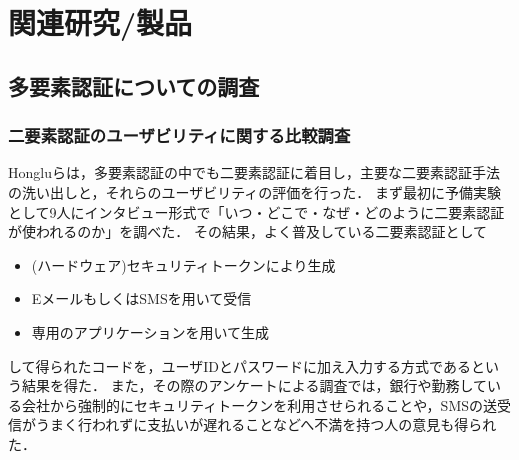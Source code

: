 \chapter{関連研究/製品}\label{chap:relatedwork}
\section{多要素認証についての調査}
\subsection{二要素認証のユーザビリティに関する比較調査}
Hongluら\cite{DBLP:journals/corr/CristofaroDFN13}は，多要素認証の中でも二要素認証に着目し，主要な二要素認証手法の洗い出しと，それらのユーザビリティの評価を行った．
まず最初に予備実験として9人にインタビュー形式で「いつ・どこで・なぜ・どのように二要素認証が使われるのか」を調べた．
その結果，よく普及している二要素認証として
\begin{itemize}
  \item (ハードウェア)セキュリティトークンにより生成
  \item EメールもしくはSMSを用いて受信
  \item 専用のアプリケーションを用いて生成
\end{itemize}
して得られたコードを，ユーザIDとパスワードに加え入力する方式であるという結果を得た．
また，その際のアンケートによる調査では，銀行や勤務している会社から強制的にセキュリティトークンを利用させられることや，SMSの送受信がうまく行われずに支払いが遅れることなどへ不満を持つ人の意見も得られた．

